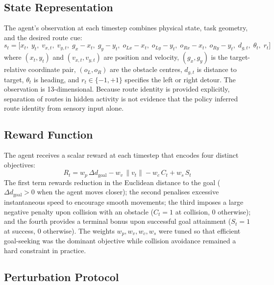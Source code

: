 \documentclass{article}
\begin{document}
\subsection{State Representation}

The agent's observation at each timestep combines physical state, task
geometry, and the desired route cue:
\begin{equation}
  s_t = \bigl[
    x_t,\;y_t,\;v_{x,t},\;v_{y,t},\;
    g_x - x_t,\;g_y - y_t,\;
    o_{Lx} - x_t,\;o_{Ly} - y_t,\;
    o_{Rx} - x_t,\;o_{Ry} - y_t,\;
    d_{g,t},\;\theta_t,\;r_t
  \bigr]
  \label{eq:state}
\end{equation}
where $(x_t,y_t)$ and $(v_{x,t},v_{y,t})$ are position and velocity,
$(g_x,g_y)$ is the target-relative coordinate pair, $(o_L,o_R)$ are the
obstacle centres, $d_{g,t}$ is distance to target, $\theta_t$ is heading,
and $r_t\in\{-1,+1\}$ specifies the left or right detour. The observation
is 13-dimensional. Because route identity is provided explicitly,
separation of routes in hidden activity is not evidence that the policy
inferred route identity from sensory input alone.

\subsection{Reward Function}

The agent receives a scalar reward at each timestep that encodes four
distinct objectives:
\begin{equation}
  R_t = w_p\,\Delta d_{\mathrm{goal}}
        - w_v\,\|v_t\|
        - w_c\,C_t
        + w_s\,S_t
  \label{eq:reward}
\end{equation}
The first term rewards reduction in the Euclidean distance to the goal
($\Delta d_{\mathrm{goal}} > 0$ when the agent moves closer);
the second penalises excessive instantaneous speed to encourage smooth
movements;
the third imposes a large negative penalty upon collision with an obstacle
($C_t = 1$ at collision, $0$ otherwise);
and the fourth provides a terminal bonus upon successful goal attainment
($S_t = 1$ at success, $0$ otherwise).
The weights $w_p, w_v, w_c, w_s$ were tuned so that efficient goal-seeking
was the dominant objective while collision avoidance remained a hard
constraint in practice.

\subsection{Perturbation Protocol}
\label{sec:methods-perturbation}
\end{document}
